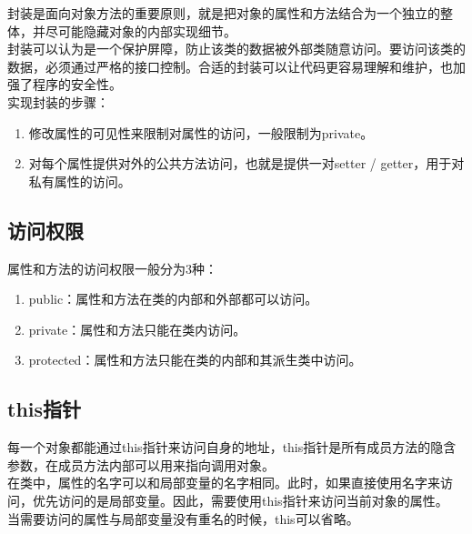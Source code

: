 封装是面向对象方法的重要原则，就是把对象的属性和方法结合为一个独立的整体，并尽可能隐藏对象的内部实现细节。 \\

封装可以认为是一个保护屏障，防止该类的数据被外部类随意访问。要访问该类的数据，必须通过严格的接口控制。合适的封装可以让代码更容易理解和维护，也加强了程序的安全性。 \\

实现封装的步骤：

\begin{enumerate}
	\item 修改属性的可见性来限制对属性的访问，一般限制为private。
	\item 对每个属性提供对外的公共方法访问，也就是提供一对setter / getter，用于对私有属性的访问。
\end{enumerate}

\subsection{访问权限}

属性和方法的访问权限一般分为3种：

\begin{enumerate}
	\item public：属性和方法在类的内部和外部都可以访问。
	\item private：属性和方法只能在类内访问。
	\item protected：属性和方法只能在类的内部和其派生类中访问。
\end{enumerate}

\subsection{this指针}

每一个对象都能通过this指针来访问自身的地址，this指针是所有成员方法的隐含参数，在成员方法内部可以用来指向调用对象。 \\

在类中，属性的名字可以和局部变量的名字相同。此时，如果直接使用名字来访问，优先访问的是局部变量。因此，需要使用this指针来访问当前对象的属性。 \\

当需要访问的属性与局部变量没有重名的时候，this可以省略。 \\


